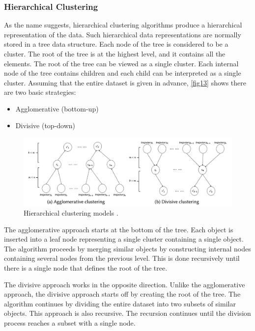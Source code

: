 \documentclass[a4paper, 12pt]{article}
\begin{document}
\subsubsection{Hierarchical Clustering}
As the name suggests, hierarchical clustering algorithms \citep{jain1999data} produce a hierarchical representation of the data. Such hierarchical data representations are normally stored in a tree data structure. Each node of the tree is considered to be a cluster. The root of the tree is at the highest level, and it contains all the elements. The root of the tree can be viewed as a single cluster. Each internal node of the tree contains children and each child can be interpreted as a single cluster. Assuming that the entire dataset is given in advance, \autoref{fig13} shows there are two basic strategies:

\begin{itemize}
    \item Agglomerative (bottom-up)
    \item Divisive (top-down)
\end{itemize}

\begin{figure}[ht]
    \centering
    \includegraphics[width=1\textwidth]{AP Clustering.png}
    \caption{Hierarchical clustering models \citep{bian2019trajectory}.}
    \label{fig13}
\end{figure}

The agglomerative approach starts at the bottom of the tree. Each object is inserted into a leaf node representing a single cluster containing a single object. The algorithm proceeds by merging similar objects by constructing internal nodes containing several nodes from the previous level. This is done recursively until there is a single node that defines the root of the tree.

The divisive approach works in the opposite direction. Unlike the agglomerative approach, the divisive approach starts off by creating the root of the tree. The algorithm continues by dividing the entire dataset into two subsets of similar objects. This approach is also recursive. The recursion continues until the division process reaches a subset with a single node. 
\end{document}
